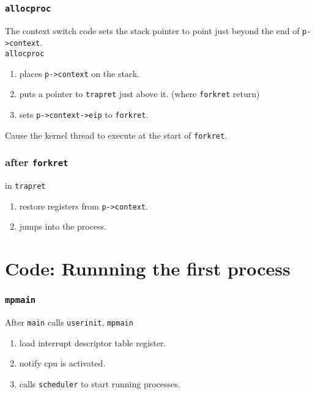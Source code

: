 \documentclass{beamer}
\begin{document}

\begin{frame}[t]
  \frametitle{\texttt{allocproc}}

  The context switch code sets the stack pointer to point just beyond the end of
  \texttt{p->context}.\\

  \texttt{allocproc} 
  \begin{enumerate}
  \item places \texttt{p->context} on the stack.
  \item puts a pointer to \texttt{trapret} just above it. (where \texttt{forkret} return)
  \item sets \texttt{p->context->eip} to \texttt{forkret}.
  \end{enumerate}

  Cause the kernel thread to execute at the start of \texttt{forkret}.
  
\end{frame}


\begin{frame}[t]
  \frametitle{after \texttt{forkret}}

  in \texttt{trapret}
  \begin{enumerate}
  \item restore registers from \texttt{p->context}.
  \item jumps into the process.
  \end{enumerate}
  
\end{frame}


\section{Code: Runnning the first process}


\begin{frame}[t]
  \frametitle{\texttt{mpmain}}

  After \texttt{main} calls \texttt{userinit}, \texttt{mpmain}
  \begin{enumerate}
  \item load interrupt descriptor table register.
  \item notify cpu is activated.
  \item calls \texttt{scheduler} to start running processes.
  \end{enumerate}
  
\end{frame}
\end{document}
